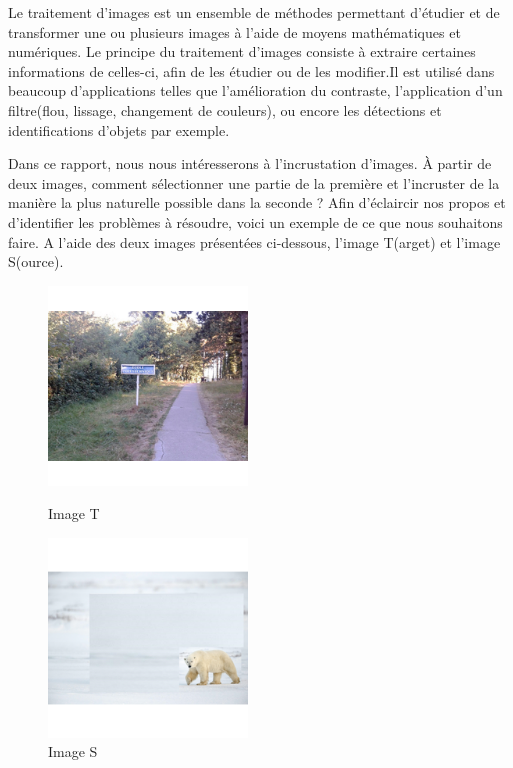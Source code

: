 
Le traitement d'images est un ensemble de méthodes permettant d'étudier et de transformer une ou plusieurs images à l'aide de moyens mathématiques et numériques. Le principe du traitement d'images consiste à extraire certaines informations de celles-ci, afin de les étudier ou de les modifier.Il est utilisé dans beaucoup d'applications telles que l'amélioration du contraste, l'application d'un filtre(flou, lissage, changement de couleurs), ou encore les détections et identifications d'objets par exemple. 

Dans ce rapport, nous nous intéresserons à l'incrustation d'images. À partir de deux images, comment sélectionner une partie de la première et l'incruster de la manière la plus naturelle possible dans la seconde ? 
\newline
Afin d'éclaircir nos propos et d'identifier les problèmes à résoudre, voici un exemple de ce que nous souhaitons faire.\newline
A l'aide des deux images présentées ci-dessous, l'image T(arget) et l'image S(ource). 
\newline
\begin{figure}[!htb]
   \begin{minipage}{0.48\textwidth}
     \centering
     \includegraphics[width = 150pt]{Annexe/OursT.png}
     \caption{Image T}
      \end{minipage}\hfill
   \begin{minipage}{0.48\textwidth}
     \centering
     \includegraphics[width= 150pt]{Annexe/OursS.png}
     \caption{Image S}\label{Fig:Data2}
   \end{minipage}
\end{figure}

